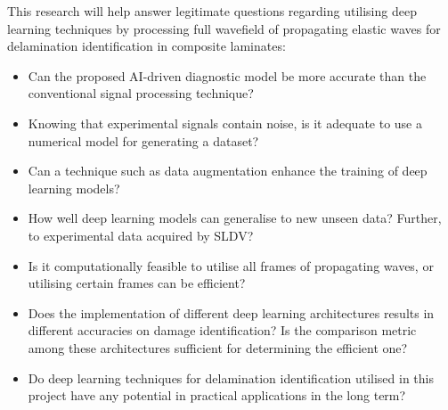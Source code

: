 This research will help answer legitimate questions regarding utilising deep learning techniques by processing full wavefield of propagating elastic waves for delamination identification in composite laminates:
\begin{itemize}
	\item Can the proposed AI-driven diagnostic model be more accurate than the conventional signal processing technique?
	\item Knowing that experimental signals contain noise, is it adequate to use a numerical model for generating a dataset?
	\item Can a technique such as data augmentation enhance the training of deep learning models?
	\item How well deep learning models can generalise to new unseen data? Further, to experimental data acquired by SLDV?
	\item Is it computationally feasible to utilise all frames of propagating waves, or utilising certain frames can be efficient?
	\item Does the implementation of different deep learning architectures results in different accuracies on damage identification? Is the comparison metric among these architectures sufficient for determining the efficient one?
	\item Do deep learning techniques for delamination identification utilised in this project have any potential in practical applications in the long term?
\end{itemize}
